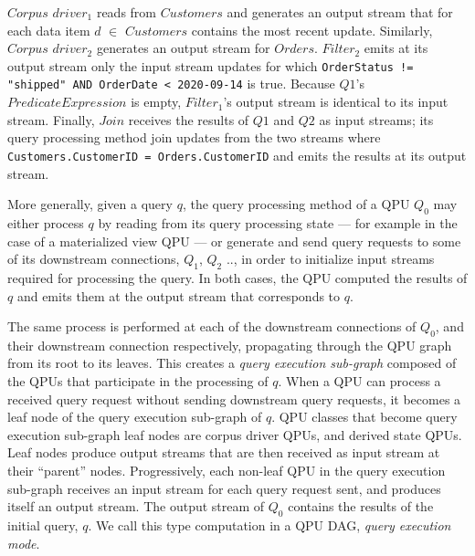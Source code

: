 $Corpus$ $driver_1$ reads from $Customers$ and generates an output stream that for each data item $d$ $\in$ $Customers$
contains the most recent update. Similarly, $Corpus$ $driver_2$ generates an output stream for $Orders$.
$Filter_2$ emits at its output stream only the input stream updates for which
{\obeylines\obeyspaces
\texttt{OrderStatus != "shipped" AND OrderDate < 2020-09-14}}
is true.
Because $Q1$'s $PredicateExpression$ is empty, $Filter_1$'s output stream is identical to its input stream.
Finally, $Join$ receives the results of $Q1$ and $Q2$ as input streams; its query processing method join updates from
the two streams where
{\obeylines\obeyspaces
\texttt{Customers.CustomerID = Orders.CustomerID}}
and emits the results at its output stream.

\medskip
\noindent
More generally, given a query $q$, the query processing method of a QPU $Q_0$ may either process $q$ by reading from its
query processing state --- for example in the case of a materialized view QPU --- or generate and send query requests to
some of its downstream connections, $Q_1$, $Q_2$ .., in order to initialize input streams required for processing the query.
In both cases, the QPU computed the results of $q$ and emits them at the output stream that corresponds to $q$.

The same process is performed at each of the downstream connections of $Q_0$, and their downstream connection respectively,
propagating through the QPU graph from its root to its leaves.
This creates a \textit{query execution sub-graph} composed of the QPUs that participate in the processing of $q$.
When a QPU can process a received query request without sending downstream query requests, it becomes a leaf node of
the query execution sub-graph of $q$.
QPU classes that become query execution sub-graph leaf nodes are corpus driver QPUs, and derived state QPUs.
Leaf nodes produce output streams that are then received as input stream at their ``parent'' nodes.
Progressively, each non-leaf QPU in the query execution sub-graph receives an input stream for each query request sent,
and produces itself an output stream.
The output stream of $Q_0$ contains the results of the initial query, $q$.
We call this type computation in a QPU DAG, \textit{query execution mode}.

